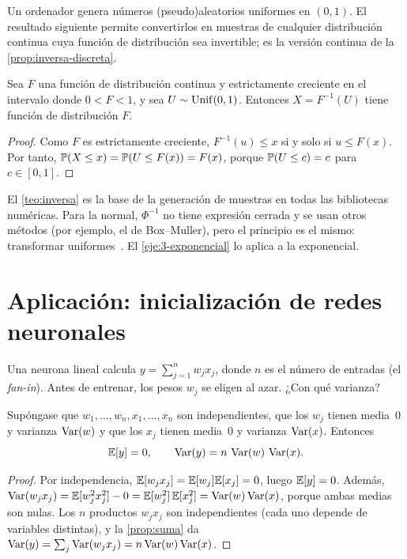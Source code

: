 Un ordenador genera números (pseudo)aleatorios uniformes en $(0,1)$. El resultado siguiente permite convertirlos en muestras de cualquier distribución continua cuya función de distribución sea invertible; es la versión continua de la \cref{prop:inversa-discreta}.

\begin{teorema}\label{teo:inversa}
Sea $F$ una función de distribución continua y estrictamente creciente en el intervalo donde $0<F<1$, y sea $U\sim\operatorname{Unif}(0,1)$. Entonces $X=F^{-1}(U)$ tiene función de distribución $F$.
\end{teorema}

\begin{proof}
Como $F$ es estrictamente creciente, $F^{-1}(u)\le x$ si y solo si $u\le F(x)$. Por tanto, $\mathbb{P}(X\le x)=\mathbb{P}(U\le F(x))=F(x)$, porque $\mathbb{P}(U\le c)=c$ para $c\in[0,1]$.
\end{proof}

\begin{observacion}
El \cref{teo:inversa} es la base de la generación de muestras en todas las bibliotecas numéricas. Para la normal, $\Phi^{-1}$ no tiene expresión cerrada y se usan otros métodos (por ejemplo, el de Box--Muller), pero el principio es el mismo: transformar uniformes~\cite[§6.7]{mml}. El \cref{eje:3-exponencial} lo aplica a la exponencial.
\end{observacion}

\section{Aplicación: inicialización de redes neuronales}

Una neurona lineal calcula $y=\sum_{j=1}^{n}w_jx_j$, donde $n$ es el número de entradas (el \emph{fan-in}). Antes de entrenar, los pesos $w_j$ se eligen al azar. ¿Con qué varianza?

\begin{proposicion}\label{prop:neurona}
Supóngase que $w_1,\dots,w_n,x_1,\dots,x_n$ son independientes, que los $w_j$ tienen media~0 y varianza $\operatorname{Var}(w)$ y que los $x_j$ tienen media~0 y varianza $\operatorname{Var}(x)$. Entonces
\[
\mathbb{E}[y]=0,\qquad \operatorname{Var}(y)=n\,\operatorname{Var}(w)\,\operatorname{Var}(x).
\]
\end{proposicion}

\begin{proof}
Por independencia, $\mathbb{E}[w_jx_j]=\mathbb{E}[w_j]\mathbb{E}[x_j]=0$, luego $\mathbb{E}[y]=0$. Además, $\operatorname{Var}(w_jx_j)=\mathbb{E}[w_j^{2}x_j^{2}]-0=\mathbb{E}[w_j^{2}]\,\mathbb{E}[x_j^{2}]=\operatorname{Var}(w)\operatorname{Var}(x)$, porque ambas medias son nulas. Los $n$ productos $w_jx_j$ son independientes (cada uno depende de variables distintas), y la \cref{prop:suma} da $\operatorname{Var}(y)=\sum_j\operatorname{Var}(w_jx_j)=n\operatorname{Var}(w)\operatorname{Var}(x)$.
\end{proof}

